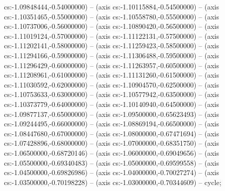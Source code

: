 cs:-1.09848444,-0.54000000) -- (axis cs:-1.10115884,-0.54500000) -- (axis cs:-1.10351465,-0.55000000) -- (axis cs:-1.10558780,-0.55500000) -- (axis cs:-1.10737006,-0.56000000) -- (axis cs:-1.10890420,-0.56500000) -- (axis cs:-1.11019124,-0.57000000) -- (axis cs:-1.11122131,-0.57500000) -- (axis cs:-1.11202141,-0.58000000) -- (axis cs:-1.11259423,-0.58500000) -- (axis cs:-1.11294166,-0.59000000) -- (axis cs:-1.11306488,-0.59500000) -- (axis cs:-1.11296429,-0.60000000) -- (axis cs:-1.11263957,-0.60500000) -- (axis cs:-1.11208961,-0.61000000) -- (axis cs:-1.11131260,-0.61500000) -- (axis cs:-1.11030592,-0.62000000) -- (axis cs:-1.10904570,-0.62500000) -- (axis cs:-1.10753633,-0.63000000) -- (axis cs:-1.10577942,-0.63500000) -- (axis cs:-1.10373779,-0.64000000) -- (axis cs:-1.10140940,-0.64500000) -- (axis cs:-1.09877137,-0.65000000) -- (axis cs:-1.09500000,-0.65623493) -- (axis cs:-1.09244495,-0.66000000) -- (axis cs:-1.08869194,-0.66500000) -- (axis cs:-1.08447680,-0.67000000) -- (axis cs:-1.08000000,-0.67471694) -- (axis cs:-1.07428896,-0.68000000) -- (axis cs:-1.07000000,-0.68351750) -- (axis cs:-1.06500000,-0.68720146) -- (axis cs:-1.06000000,-0.69049656) -- (axis cs:-1.05500000,-0.69340483) -- (axis cs:-1.05000000,-0.69599558) -- (axis cs:-1.04500000,-0.69826986) -- (axis cs:-1.04000000,-0.70027274) -- (axis cs:-1.03500000,-0.70198228) -- (axis cs:-1.03000000,-0.70344609) -- cycle;
